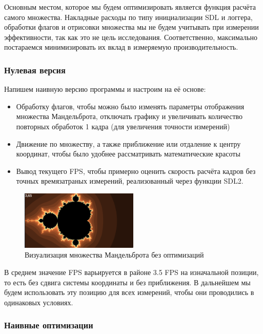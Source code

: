 \documentclass[12pt,a4paper]{article}
\begin{document}
Основным местом, которое мы будем оптимизировать является функция расчёта самого множества. Накладные расходы по типу инициализации SDL и логгера, обработки флагов и отрисовки множества мы не будем учитывать при измерении эффективности, так как это не цель исследования. Соответственно, максимально постараемся минимизировать их вклад в измеряемую производительность.


\subsubsection{Нулевая версия} 

Напишем наивную версию программы и настроим на её основе:
\begin{itemize}
    \item Обработку флагов, чтобы можно было изменять параметры отображения множества Мандельброта, отключать графику и увеличивать количество повторных обработок 1 кадра (для увеличения точности измерений)
    \item Движение по множеству, а также приближение или отдаление к центру координат, чтобы было удобнее рассматривать математические красоты
    \item Вывод текущего FPS, чтобы примерно оценить скорость расчёта кадров без точных времязатраных измерений, реализованный через функции SDL2.
\end{itemize}

\begin{figure}[ht!]
    \centering
    \includegraphics[width=0.5\textwidth]{mand_O0.png}
    \caption{Визуализация множества Мандельброта без оптимизаций}
    \label{fig:mand_O0}
\end{figure}

В среднем значение FPS варьируется в районе 3.5 FPS на изначальной позиции, то есть без сдвига системы координаты и без приближения. В дальнейшем мы будем использовать эту позицию для всех измерений, чтобы они проводились в одинаковых условиях.

\subsubsection{Наивные оптимизации} 
\end{document}
